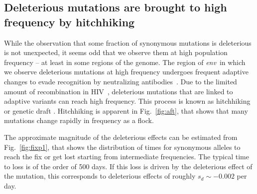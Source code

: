 \documentclass[rmp, twocolumn]{revtex4}
\newcommand{\FIG}[1]{Fig.~\ref{fig:#1}}
\newcommand{\env}{\textit{env}}
\begin{document}
\subsection{Deleterious mutations are brought to high frequency by hitchhiking}
While the observation that some fraction of synonymous mutations is deleterious
is not unexpected, it seems odd that we observe them at high population
frequency -- at least in some regions of the genome. The region of \env~in
which we observe deleterious mutations at high frequency undergoes frequent
adaptive changes to evade recognition by neutralizing 
antibodies~\cite{williamson_adaptation_2003,richman_rapid_2003}. Due to the 
limited amount of recombination in HIV~\cite{neher_recombination_2010,batorsky_estimate_2011},
deleterious mutations that are linked to adaptive variants can reach high
frequency. This process is known as hitchhiking \citep{smith_hitch-hiking_1974}
or genetic draft \citep{gillespie_genetic_2000,neher_genetic_2011}.
Hitchhiking is  apparent in \FIG{aft}, that shows that many mutations
change rapidly in frequency as a flock. 

The approximate magnitude of the deleterious effects can be estimated from
\FIG{fixp1}, that shows the distribution of times for synonymous
alleles to reach the fix or get lost starting from intermediate frequencies. The
typical time to loss is of the order of 500 days. If this loss is driven by the
deleterious effect of the mutation, this corresponds to deleterious effects of
roughly $s_d \sim - 0.002$ per day.
\end{document}
